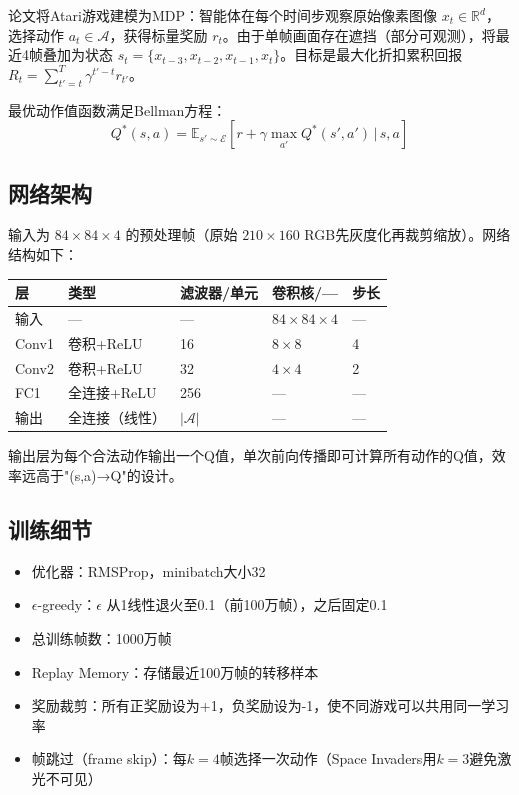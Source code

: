 \documentclass{article}
\begin{document}
论文将Atari游戏建模为MDP：智能体在每个时间步观察原始像素图像 $x_t \in \mathbb{R}^d$，选择动作 $a_t \in \mathcal{A}$，获得标量奖励 $r_t$。由于单帧画面存在遮挡（部分可观测），将最近4帧叠加为状态 $s_t = \{x_{t-3}, x_{t-2}, x_{t-1}, x_t\}$。目标是最大化折扣累积回报 $R_t = \sum_{t'=t}^T \gamma^{t'-t} r_{t'}$。

最优动作值函数满足Bellman方程：
$$Q^*(s,a) = \mathbb{E}_{s' \sim \mathcal{E}}\left[r + \gamma \max_{a'} Q^*(s', a') \,\Big|\, s, a\right]$$

\subsection{网络架构}

输入为 $84 \times 84 \times 4$ 的预处理帧（原始 $210 \times 160$ RGB先灰度化再裁剪缩放）。网络结构如下：

\begin{center}
\begin{tabular}{lllll}
\toprule
层 & 类型 & 滤波器/单元 & 卷积核/— & 步长 \\
\midrule
输入 & — & — & $84\times84\times4$ & — \\
Conv1 & 卷积+ReLU & 16 & $8\times8$ & 4 \\
Conv2 & 卷积+ReLU & 32 & $4\times4$ & 2 \\
FC1 & 全连接+ReLU & 256 & — & — \\
输出 & 全连接（线性） & $|\mathcal{A}|$ & — & — \\
\bottomrule
\end{tabular}
\end{center}

输出层为每个合法动作输出一个Q值，单次前向传播即可计算所有动作的Q值，效率远高于"(s,a)→Q"的设计。

\subsection{训练细节}

\begin{itemize}
    \item 优化器：RMSProp，minibatch大小32
    \item $\epsilon$-greedy：$\epsilon$ 从1线性退火至0.1（前100万帧），之后固定0.1
    \item 总训练帧数：1000万帧
    \item Replay Memory：存储最近100万帧的转移样本
    \item 奖励裁剪：所有正奖励设为+1，负奖励设为-1，使不同游戏可以共用同一学习率
    \item 帧跳过（frame skip）：每$k=4$帧选择一次动作（Space Invaders用$k=3$避免激光不可见）
\end{itemize}
\end{document}
